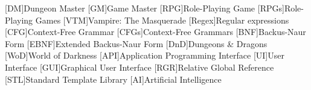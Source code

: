 [DM]{Dungeon Master}
[GM]{Game Master}
[RPG]{Role-Playing Game}
[RPGs]{Role-Playing Games}
[VTM]{Vampire: The Masquerade}
[Regex]{Regular expressions}
[CFG]{Context-Free Grammar}
[CFGs]{Context-Free Grammars}
[BNF]{Backus-Naur Form}
[EBNF]{Extended Backus-Naur Form}
[DnD]{Dungeons \& Dragons}
[WoD]{World of Darkness}
[API]{Application Programming Interface}
[UI]{User Interface}
[GUI]{Graphical User Interface}
[RGR]{Relative Global Reference}
[STL]{Standard Template Library}
[AI]{Artificial Intelligence}
